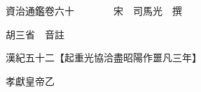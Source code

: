 










 


 
 


 

  
  
  
  
  





  
  
  
  
  
 
  

  

  
  
  



  

 
 

  
   




  

  
  


  　　資治通鑑卷六十　　　　宋　司馬光　撰

　　胡三省　音註

　　漢紀五十二【起重光協洽盡昭陽作噩凡三年】

　　孝獻皇帝乙


